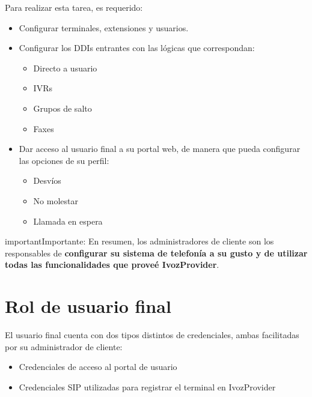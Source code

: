 \documentclass[letterpaper,10pt,spanish]{sphinxmanual}
\begin{document}
Para realizar esta tarea, es requerido:
\begin{itemize}
\item {} 
Configurar terminales, extensiones y usuarios.

\item {} 
Configurar los DDIs entrantes con las lógicas que correspondan:
\begin{itemize}
\item {} 
Directo a usuario

\item {} 
IVRs

\item {} 
Grupos de salto

\item {} 
Faxes

\end{itemize}

\item {} 
Dar acceso al usuario final a su portal web, de manera que pueda configurar las opciones de su perfil:
\begin{itemize}
\item {} 
Desvíos

\item {} 
No molestar

\item {} 
Llamada en espera

\end{itemize}

\end{itemize}

\begin{notice}{important}{Importante:}
En resumen, los administradores de cliente son los responsables de \textbf{configurar su sistema de telefonía a su gusto y de utilizar todas las funcionalidades que proveé IvozProvider}.
\end{notice}


\section{Rol de usuario final}
\label{basic_concepts/operation_roles/index:final-user-role}
El usuario final cuenta con dos tipos distintos de credenciales, ambas facilitadas por su administrador de cliente:
\begin{itemize}
\item {} 
Credenciales de acceso al portal de usuario

\item {} 
Credenciales SIP utilizadas para registrar el terminal en IvozProvider

\end{itemize}
\end{document}
